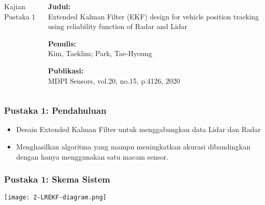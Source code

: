 \begin{frame}
    \begin{columns}
        \begin{column}{0.35\textwidth}
            \LARGE
            Kajian Pustaka 1
        \end{column}
        \begin{column}{0.6\textwidth}
            \justifying
            \textbf{Judul:}\\
            Extended Kalman Filter (EKF) design for vehicle position tracking using reliability function of Radar and Lidar

            \vspace{1.5em}

            \textbf{Penulis:}\\
            Kim, Taeklim; Park, Tae-Hyoung

            \vspace{1.5em}
            
            \textbf{Publikasi:}\\
            MDPI Sensors, vol.20, no.15, p.4126, 2020
        \end{column}
    \end{columns}
\end{frame}


\begin{frame}
    \frametitle{Pustaka 1: Pendahuluan}
    \large
    \begin{itemize}
        \justifying
        \item Desain Extended Kalman Filter untuk menggabungkan data Lidar dan Radar
        \vspace{1em}
        \item Menghasilkan algoritma yang mampu meningkatkan akurasi dibandingkan dengan hanya menggunakan satu macam sensor.
    \end{itemize}
\end{frame}


\begin{frame}
    \frametitle{Pustaka 1: Skema Sistem}
    \centering
    \texttt{[image: 2-LREKF-diagram.png]}
\end{frame}


